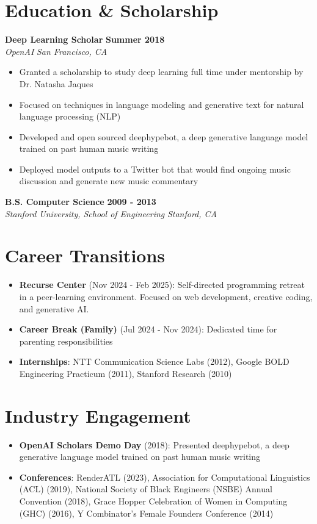 \documentclass[10pt,letterpaper]{article}
\newcommand{\experienceentry}[5]{
  \noindent\textbf{#1} \hfill \textbf{#2}\\
  \textit{#3} \hfill \textit{#4}\\[-8pt]
  #5
}
\newcommand{\educationentry}[4]{
  \noindent\textbf{#1} \hfill \textbf{#2}\\
  \textit{#3} \hfill \textit{#4}
}
\begin{document}
\section{Education \& Scholarship}
\experienceentry{Deep Learning Scholar}{Summer 2018}{OpenAI}{San Francisco, CA}{
\begin{itemize}[leftmargin=*, nosep]
  \item Granted a scholarship to study deep learning full time under mentorship by Dr. Natasha Jaques
  \item Focused on techniques in language modeling and generative text for natural language processing (NLP)
  \item Developed and open sourced deephypebot, a deep generative language model trained on past human music writing
  \item Deployed model outputs to a Twitter bot that would find ongoing music discussion and generate new music commentary
\end{itemize}
}

\vspace{0.3em}

\educationentry{B.S. Computer Science}{2009 - 2013}{Stanford University, School of Engineering}{Stanford, CA}

\section{Career Transitions}
\begin{itemize}[leftmargin=*, nosep]
  \item \textbf{Recurse Center} (Nov 2024 - Feb 2025): Self-directed programming retreat in a peer-learning environment. Focused on web development, creative coding, and generative AI.
  \item \textbf{Career Break (Family)} (Jul 2024 - Nov 2024): Dedicated time for parenting responsibilities
  \item \textbf{Internships}: NTT Communication Science Labs (2012), Google BOLD Engineering Practicum (2011), Stanford Research (2010)
\end{itemize}

\section{Industry Engagement}
\begin{itemize}[leftmargin=*, nosep]
  \item \textbf{OpenAI Scholars Demo Day} (2018): Presented deephypebot, a deep generative language model trained on past human music writing
  \item \textbf{Conferences}: RenderATL (2023), Association for Computational Linguistics (ACL) (2019), National Society of Black Engineers (NSBE) Annual Convention (2018), Grace Hopper Celebration of Women in Computing (GHC) (2016), Y Combinator's Female Founders Conference (2014)
\end{itemize}
\end{document}
